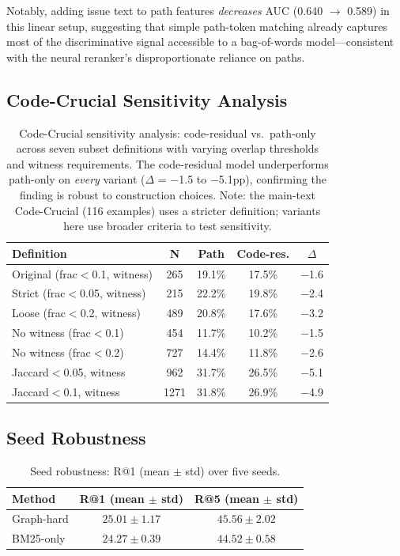 \documentclass{article}
\begin{document}
Notably, adding issue text to path features \emph{decreases} AUC (0.640 $\to$ 0.589) in this linear setup, suggesting that simple path-token matching already captures most of the discriminative signal accessible to a bag-of-words model---consistent with the neural reranker's disproportionate reliance on paths.

\subsection{Code-Crucial Sensitivity Analysis}
\label{app:cc_sensitivity}

\begin{table}[h]
\centering
\caption{Code-Crucial sensitivity analysis: code-residual vs.\ path-only across seven subset definitions with varying overlap thresholds and witness requirements. The code-residual model underperforms path-only on \emph{every} variant ($\Delta$ = $-$1.5 to $-$5.1pp), confirming the finding is robust to construction choices. Note: the main-text Code-Crucial (116 examples) uses a stricter definition; variants here use broader criteria to test sensitivity.}
\label{tab:cc_sensitivity}
\small
\begin{tabular}{lcccc}
\toprule
\textbf{Definition} & \textbf{N} & \textbf{Path} & \textbf{Code-res.} & \textbf{$\Delta$} \\
\midrule
Original (frac$<$0.1, witness) & 265 & 19.1\% & 17.5\% & $-$1.6 \\
Strict (frac$<$0.05, witness) & 215 & 22.2\% & 19.8\% & $-$2.4 \\
Loose (frac$<$0.2, witness) & 489 & 20.8\% & 17.6\% & $-$3.2 \\
No witness (frac$<$0.1) & 454 & 11.7\% & 10.2\% & $-$1.5 \\
No witness (frac$<$0.2) & 727 & 14.4\% & 11.8\% & $-$2.6 \\
Jaccard$<$0.05, witness & 962 & 31.7\% & 26.5\% & $-$5.1 \\
Jaccard$<$0.1, witness & 1271 & 31.8\% & 26.9\% & $-$4.9 \\
\bottomrule
\end{tabular}
\end{table}

\subsection{Seed Robustness}
\label{app:seeds}

\begin{table}[h]
\centering
\caption{Seed robustness: R@1 (mean $\pm$ std) over five seeds.}
\label{tab:seeds}
\small
\begin{tabular}{lcc}
\toprule
\textbf{Method} & \textbf{R@1 (mean $\pm$ std)} & \textbf{R@5 (mean $\pm$ std)} \\
\midrule
Graph-hard   & $25.01 \pm 1.17$ & $45.56 \pm 2.02$ \\
BM25-only    & $24.27 \pm 0.39$ & $44.52 \pm 0.58$ \\
\bottomrule
\end{tabular}
\end{table}
\end{document}
